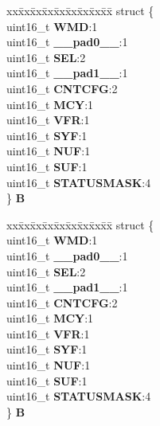 \begin{DoxyCompactItemize}
\begin{tabbing}
\end{tabbing}\item 
\mbox{\label{unionuSSCCR_a84e5e5349916d709f5a3f03b85dd3fcd}} 
\begin{tabbing}
xx\=xx\=xx\=xx\=xx\=xx\=xx\=xx\=xx\=\kill
struct \{\\
\>uint16\_t {\bfseries WMD}:1\\
\>uint16\_t {\bfseries \_\_pad0\_\_}:1\\
\>uint16\_t {\bfseries SEL}:2\\
\>uint16\_t {\bfseries \_\_pad1\_\_}:1\\
\>uint16\_t {\bfseries CNTCFG}:2\\
\>uint16\_t {\bfseries MCY}:1\\
\>uint16\_t {\bfseries VFR}:1\\
\>uint16\_t {\bfseries SYF}:1\\
\>uint16\_t {\bfseries NUF}:1\\
\>uint16\_t {\bfseries SUF}:1\\
\>uint16\_t {\bfseries STATUSMASK}:4\\
\} {\bfseries B}\\

\end{tabbing}\item 
\mbox{\label{unionuSSCCR_a28bdd8519832324cc61447d3e04b8c7f}} 
\begin{tabbing}
xx\=xx\=xx\=xx\=xx\=xx\=xx\=xx\=xx\=\kill
struct \{\\
\>uint16\_t {\bfseries WMD}:1\\
\>uint16\_t {\bfseries \_\_pad0\_\_}:1\\
\>uint16\_t {\bfseries SEL}:2\\
\>uint16\_t {\bfseries \_\_pad1\_\_}:1\\
\>uint16\_t {\bfseries CNTCFG}:2\\
\>uint16\_t {\bfseries MCY}:1\\
\>uint16\_t {\bfseries VFR}:1\\
\>uint16\_t {\bfseries SYF}:1\\
\>uint16\_t {\bfseries NUF}:1\\
\>uint16\_t {\bfseries SUF}:1\\
\>uint16\_t {\bfseries STATUSMASK}:4\\
\} {\bfseries B}\\

\end{tabbing}\end{DoxyCompactItemize}


